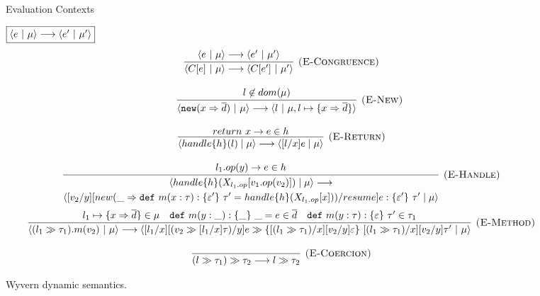 \documentclass{article}
\newcommand{\keywadj}[1]{\mathtt{#1}}
\newcommand{\keyw}[1]{\keywadj{#1}~}
\begin{document}
\begin{figure}[H]
{\[\begin{array}{lll}
\begin{array}{lllr}
\
\end{array}
\end{array}
\]


\caption{Evaluation Contexts}

$\fbox{$\langle e~|~\mu \rangle \longrightarrow \langle e'~|~\mu' \rangle$}$
\[
\begin{array}{c}
\infer[\textsc{(E-Congruence)}]
  {\langle C[e]~|~\mu \rangle \longrightarrow \langle C[e']~|~\mu' \rangle}
  {\langle e~|~\mu \rangle \longrightarrow \langle e'~|~\mu' \rangle} \\[3ex]
~~~~~
\infer[\textsc{(E-New)}]
  {\langle \keywadj{new} (x \Rightarrow \overline{d})  ~|~\mu \rangle \longrightarrow \langle l ~|~\mu, l \mapsto \{ x \Rightarrow \overline{d} \}  \rangle}
  {l \not\in dom(\mu)}\\[3ex]



\infer[\textsc{(E-Return)}]
  {\langle handle\{h\} (l) \mid \mu \rangle \longrightarrow \langle [l/x]e \mid \mu \rangle}
  {return\ x \rightarrow e \in h}\\[3ex]
  
  \infer[\textsc{(E-Handle)}]
  { \begin{gathered} 
  \langle handle\{h\} (X_{l_1.op}[v_1.op(v_2)])  \mid \mu \rangle \longrightarrow \\
  \langle [v_2/y][new(\_ \Rightarrow  \keyw{def} m(x: \tau) : \{\varepsilon' \}\ \tau' = handle\{h\}(X_{l_1.op}[x]))/resume]e :\{\varepsilon'\}\ \tau' \mid \mu \rangle
  \end {gathered} }
  { l_1.op(y) \rightarrow e \in h }\\[3ex]
  
  \infer[\textsc{(E-Method)}]
  { \langle (l_1 \gg \tau_1).m(v_2)~|~\mu \rangle \longrightarrow \langle [l_1 /x][(v_2 \gg [l_1/x]\tau)/y]e \gg \{[(l_1 \gg \tau_1)/x][v_2/y]\varepsilon\}\ [(l_1 \gg \tau_1)/x][v_2/y]\tau'~|~\mu \rangle}
  {   l_1 \mapsto \{ x \Rightarrow \overline{d} \}\in \mu & \keyw{def} m(y : \_) : \{ \_ \}~\_ = e \in \overline{d}  & \keyw{def} m(y: \tau) : \{\varepsilon\}\ \tau'  \in \tau_1} \\[3ex]
  
  \infer[\textsc{(E-Coercion)}]
  {(l \gg \tau_1) \gg \tau_2 \longrightarrow l \gg \tau_2}
  {}

\end{array}
\]
}
\caption{Wyvern dynamic semantics.}
\label{f-effects-dynamic-semantics}
\end{figure}
\end{document}
